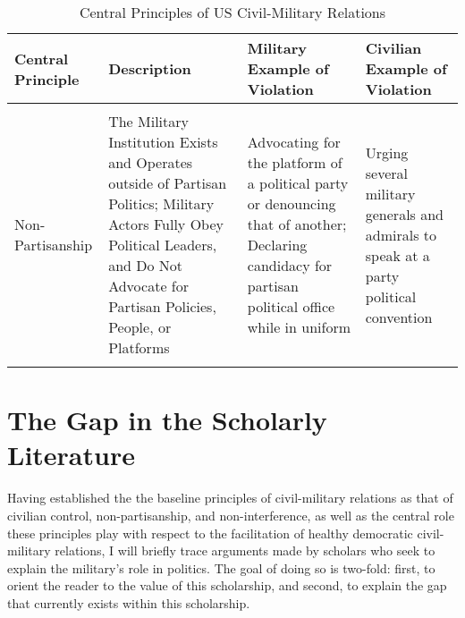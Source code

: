 \documentclass[
  12pt,
  oneside]{memoir}
\begin{document}
\begin{table}

\caption{\label{tab:principles}Central Principles of US Civil-Military Relations}
\centering
\fontsize{10}{12}\selectfont
\begin{tabular}[t]{>{\raggedright\arraybackslash}p{6em}>{\raggedright\arraybackslash}p{12em}>{\raggedright\arraybackslash}p{12em}>{\raggedright\arraybackslash}p{12em}}
\toprule
Central Principle & Description & Military Example of Violation & Civilian Example of Violation\\
\midrule
\cellcolor{gray!6}{Civilian Control} & \cellcolor{gray!6}{Civilian Political Goals are Actualized and Implemented; Mechanisms of Civilian Oversight Function; No Overt Military Insubordination} & \cellcolor{gray!6}{Resigning in protest of policy; slow-rolling policy implementation; authoring an op-ed that criticizes a President's policy preferences} & \cellcolor{gray!6}{Failing to establish mechanisms and processes of oversight; delegating too much power to the military}\\
Non-Partisanship & The Military Institution Exists and Operates outside of Partisan Politics; Military Actors Fully Obey Political Leaders, and Do Not Advocate for Partisan Policies, People, or Platforms & Advocating for the platform of a political party or denouncing that of another; Declaring candidacy for partisan political office while in uniform & Urging several military generals and admirals to speak at a party political convention\\
\cellcolor{gray!6}{Non-Interference} & \cellcolor{gray!6}{There are Areas or Realms of State Policy making into which the Military does not Enter or Seek to Influence} & \cellcolor{gray!6}{Advocating that the President place the military in charge of overhauling social security} & \cellcolor{gray!6}{Appointing a serving unformed military officer as the Secretary of Labor or Education}\\
\bottomrule
\end{tabular}
\end{table}

\hypertarget{the-gap-in-the-scholarly-literature}{%
\chapter{The Gap in the Scholarly Literature}\label{the-gap-in-the-scholarly-literature}}

Having established the the baseline principles of civil-military relations as that of civilian control, non-partisanship, and non-interference, as well as the central role these principles play with respect to the facilitation of healthy democratic civil-military relations, I will briefly trace arguments made by scholars who seek to explain the military's role in politics. The goal of doing so is two-fold: first, to orient the reader to the value of this scholarship, and second, to explain the gap that currently exists within this scholarship.
\end{document}
